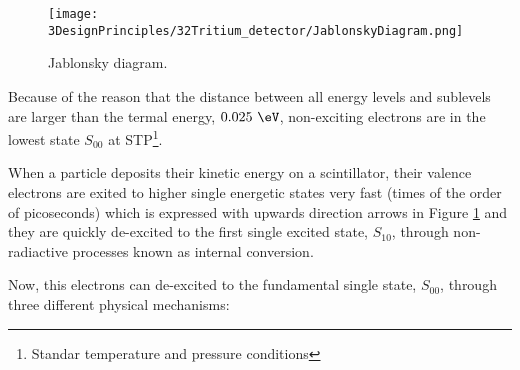 \begin{figure}[htbp]
\centering
\texttt{[image: 3DesignPrinciples/32Tritium\_detector/JablonskyDiagram.png]}
\caption{Jablonsky diagram.\label{fig:JablonskyDiagram}~\cite{Knoll}}
\end{figure}

Because of the reason that the distance between all energy levels and sublevels are larger than the termal energy, $0.025~\eV$, non-exciting electrons are in the lowest state $S_{00}$ at STP\footnote{Standar temperature and pressure conditions}.

When a particle deposits their kinetic energy on a scintillator, their valence electrons are exited to higher single energetic states very fast (times of the order of picoseconds) which is expressed with upwards direction arrows in Figure \ref{fig:JablonskyDiagram} and they are quickly de-excited to the first single excited state, $S_{10}$, through non-radiactive processes known as internal conversion.

Now, this electrons can de-excited to the fundamental single state, $S_{00}$, through three different physical mechanisms:


